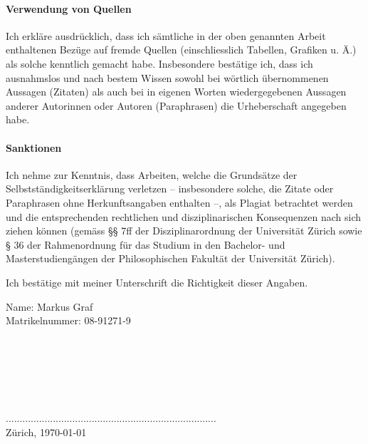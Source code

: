 \documentclass[german,12pt,doc]{apa}
\begin{document}
\paragraph{Verwendung von Quellen} 
Ich erkläre ausdrücklich, dass ich sämtliche in der oben genannten Arbeit enthaltenen Bezüge auf fremde Quellen (einschliesslich Tabellen, Grafiken u. Ä.) als solche kenntlich gemacht habe. Insbesondere bestätige ich, dass ich ausnahmslos und nach bestem Wissen sowohl bei wörtlich übernommenen Aussagen (Zitaten) als auch bei in eigenen Worten wiedergegebenen Aussagen anderer Autorinnen oder Autoren (Paraphrasen) die Urheberschaft angegeben habe. 

\paragraph{Sanktionen}
Ich nehme zur Kenntnis, dass Arbeiten, welche die Grundsätze der 
Selbstständigkeitserklärung verletzen – insbesondere solche, die Zitate oder Paraphrasen ohne Herkunftsangaben enthalten –, als Plagiat betrachtet werden und die entsprechenden rechtlichen und disziplinarischen Konsequenzen nach sich ziehen können (gemäss §§ 7ff der Disziplinarordnung der Universität Zürich sowie § 36 der Rahmenordnung für das Studium in den Bachelor- und Masterstudiengängen der Philosophischen Fakultät der Universität Zürich). 

Ich bestätige mit meiner Unterschrift die Richtigkeit dieser Angaben.

Name: Markus Graf\\
Matrikelnummer:  08-91271-9\\
\\
\\
\\
\\
\\
\\
............................................................................\\
Zürich, \today
\end{document}
